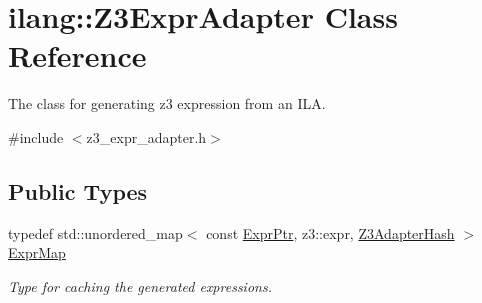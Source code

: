 \hypertarget{classilang_1_1_z3_expr_adapter}{}\section{ilang\+:\+:Z3\+Expr\+Adapter Class Reference}
\label{classilang_1_1_z3_expr_adapter}


The class for generating z3 expression from an I\+LA.  




{\ttfamily \#include $<$z3\+\_\+expr\+\_\+adapter.\+h$>$}

\subsection*{Public Types}
\begin{DoxyCompactItemize}
\item 
\mbox{\label{classilang_1_1_z3_expr_adapter_a436c6e57e304f011380816315d0d8d85}} 
typedef std\+::unordered\+\_\+map$<$ const \mbox{\hyperlink{namespaceilang_a7c4196c72e53ea4df4b7861af7bc3bce}{Expr\+Ptr}}, z3\+::expr, \mbox{\hyperlink{namespaceilang_a784e2a4ef111b96f327b76f11e86b01a}{Z3\+Adapter\+Hash}} $>$ \mbox{\hyperlink{classilang_1_1_z3_expr_adapter_a436c6e57e304f011380816315d0d8d85}{Expr\+Map}}
\begin{DoxyCompactList}\small\item\em Type for caching the generated expressions. \end{DoxyCompactList}\end{DoxyCompactItemize}
